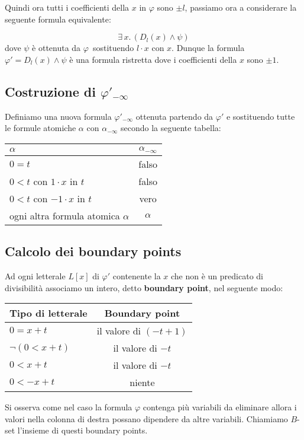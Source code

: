 \documentclass[11pt,letterpaper,twoside]{article}
\begin{document}
Quindi ora tutti i coefficienti della $x$ in $\varphi$ sono $\pm l$, passiamo
ora a considerare la seguente formula equivalente:

$$ \exists \, x . \, (D_l(x) \land \psi)  $$
dove $\psi$ \`e ottenuta da $\varphi$\ sostituendo $l \cdot x$ con $x$.
Dunque la formula $\varphi' = D_l(x) \land \psi$ \`e una formula ristretta dove
i coefficienti della $x$ sono $\pm 1$.

\subsection{Costruzione di $\varphi'_{- \infty}$}
Definiamo una nuova formula $\varphi'_{- \infty}$ ottenuta partendo da
$\varphi'$ e sostituendo tutte le formule atomiche $\alpha$ con $\alpha_{-
  \infty}$ secondo la seguente tabella:

\begin{center}
  \begin{tabular}{ l | c }
    $\alpha$ & $\alpha_{- \infty}$ \\ \hline
    $0=t$ & falso \\
    $0 < t$ con $1 \cdot x$ in $t$ & falso \\
    $0 < t$ con $-1 \cdot x$ in $t$ & vero \\
    ogni altra formula atomica $\alpha$ & $\alpha$ \\
  \end{tabular}
\end{center}

\subsection{Calcolo dei boundary points}
Ad ogni letterale $L[x]$ di $\varphi '$ contenente la $x$ che non \`e un
predicato di divisibilit\`a associamo un intero, detto \textbf{boundary point},
nel seguente modo:

\begin{center}
  \begin{tabular}{ l | c }
    Tipo di letterale & Boundary point \\ \hline
    $0=x+t$ & il valore di $(-t + 1)$ \\
    $\lnot (0 < x+t)$ & il valore di $-t$ \\
    $0 < x + t$ & il valore di $-t$ \\
    $0 < -x + t$ &  niente
  \end{tabular}
\end{center}
Si osserva come nel caso la formula $\varphi$ contenga pi\`u variabili da eliminare
allora i valori nella colonna di destra possano dipendere da altre variabili.
Chiamiamo $B$-set l'insieme di questi boundary points.
\end{document}
